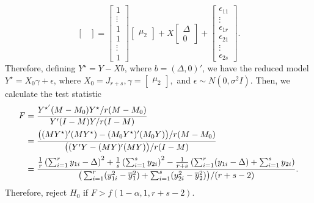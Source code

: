 \documentclass[11pt]{article}
\begin{document}
\begin{itemize}
\[\begin{bmatrix}
\end{bmatrix} = \begin{bmatrix}
1 \\ \vdots \\ 1 \\ 1 \\ \vdots \\ 1
\end{bmatrix}\begin{bmatrix}
\mu_2
\end{bmatrix} + X\begin{bmatrix}
\Delta \\ 0
\end{bmatrix} + \begin{bmatrix}
\epsilon_{11} \\ \vdots \\ \epsilon_{1r} \\ \epsilon_{21} \\ \vdots \\ \epsilon_{2s}
\end{bmatrix}.
\]
Therefore, defining $Y^\star = Y - Xb$, where $b = (\Delta,0)'$, we have the reduced model $Y^\star = X_0\gamma + \epsilon$, where $X_0 = J_{r+s}, \gamma = \begin{bmatrix}
\mu_2
\end{bmatrix},$ and $\epsilon \sim N(0,\sigma^2I)$.
Then, we calculate the test statistic
\begin{align*}
F &= \frac{Y^{\star'}(M-M_0)Y^\star/r(M-M_0)}{Y'(I-M)Y/r(I-M)} \\
&= \frac{\big{(}(MY^{\star})'(MY^\star) - (M_0Y^\star)'(M_0Y)\big{)}/r(M-M_0)}{\big{(}(Y'Y - (MY)'(MY) \big{)}/r(I-M)} \\
&= \frac{\frac{1}{r}\left(\sum_{i=1}^ry_{1i} - \Delta\right)^2 + \frac{1}{s}\left(\sum_{i=1}^sy_{2i}\right)^2 - \frac{1}{r+s}\left(\sum_{i=1}^r(y_{1i} - \Delta) + \sum_{i=1}^sy_{2i}\right)}{\big{(}\sum_{i=1}^r(y_{1i}^2 - \overline{y}_1^2) + \sum_{i=1}^s(y_{2i}^2 - \overline{y}_2^2)\big{)}/(r+s-2)}.
\end{align*}
Therefore, reject $H_0$ if $F > f(1-\alpha, 1, r+s-2)$.
\end{itemize}
\end{document}
